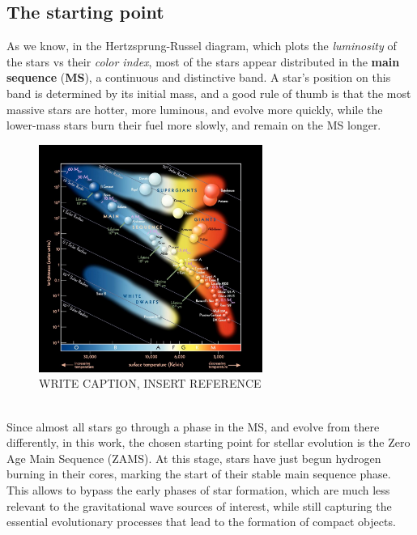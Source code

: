 \subsection{The starting point}
As we know, in the Hertzsprung-Russel diagram, which plots the \textit{luminosity} of the stars vs their \textit{color index}, most of the stars appear distributed in the \textbf{main sequence} (\textbf{MS}), a continuous and distinctive band.
A star's position on this band is determined by its initial mass, and a good rule of thumb is that the most massive stars are hotter, more luminous, and evolve more quickly, while the lower-mass stars burn their fuel more slowly, and remain on the MS longer.
\begin{figure}[h!]
    \begin{center}
        \includegraphics[width=0.65\textwidth]{images/Hertzsprung_Russel_Diagram.jpg}
    \end{center}
    \caption{WRITE CAPTION, INSERT REFERENCE}\label{fig: Hertzsprung_Russel_Diagram}
\end{figure}\\
Since almost all stars go through a phase in the MS, and evolve from there differently, in this work, the chosen starting point for stellar evolution is the Zero Age Main Sequence (ZAMS). 
At this stage, stars have just begun hydrogen burning in their cores, marking the start of their stable main sequence phase.
This allows to bypass the early phases of star formation, which are much less relevant to the gravitational wave sources of interest, while still capturing the essential evolutionary processes that lead to the formation of compact objects.


